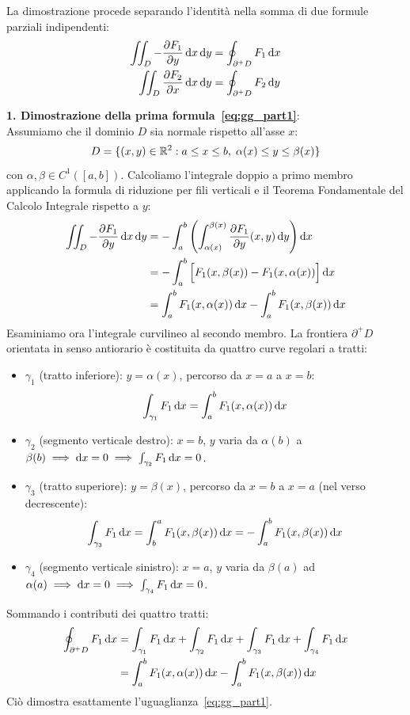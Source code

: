 \begin{dimostrazione}
La dimostrazione procede separando l'identità nella somma di due formule parziali indipendenti:
\begin{align}
\label{eq:gg_part1}
\iint_D -\frac{\partial F_1}{\partial y} \mathop{}\!\mathrm{d} x\mathop{}\!\mathrm{d} y &= \oint_{\partial^+ D} F_1 \mathop{}\!\mathrm{d} x \\
\label{eq:gg_part2}
\iint_D \frac{\partial F_2}{\partial x} \mathop{}\!\mathrm{d} x\mathop{}\!\mathrm{d} y &= \oint_{\partial^+ D} F_2 \mathop{}\!\mathrm{d} y
\end{align}

\medskip\noindent\textbf{1. Dimostrazione della prima formula~\eqref{eq:gg_part1}}:\\
Assumiamo che il dominio $D$ sia normale rispetto all'asse $x$:
\[
D = \{(x,y) \in \mathbb{R}^2 : a \le x \le b, \; \alpha(x) \le y \le \beta(x)\}
\]
con $\alpha, \beta \in C^1([a,b])$.
Calcoliamo l'integrale doppio a primo membro applicando la formula di riduzione per fili verticali e il Teorema Fondamentale del Calcolo Integrale rispetto a $y$:
\begin{align*}
\iint_D -\frac{\partial F_1}{\partial y} \mathop{}\!\mathrm{d} x\mathop{}\!\mathrm{d} y &= -\int_{a}^{b} \left( \int_{\alpha(x)}^{\beta(x)} \frac{\partial F_1}{\partial y}(x,y) \mathop{}\!\mathrm{d} y \right) \mathop{}\!\mathrm{d} x \\
&= -\int_{a}^{b} \Big[ F_1(x, \beta(x)) - F_1(x, \alpha(x)) \Big] \mathop{}\!\mathrm{d} x \\
&= \int_{a}^{b} F_1(x, \alpha(x)) \mathop{}\!\mathrm{d} x - \int_{a}^{b} F_1(x, \beta(x)) \mathop{}\!\mathrm{d} x
\end{align*}
Esaminiamo ora l'integrale curvilineo al secondo membro. La frontiera $\partial^+ D$ orientata in senso antiorario è costituita da quattro curve regolari a tratti:
\begin{itemize}
    \item $\gamma_1$ (tratto inferiore): $y = \alpha(x)$, percorso da $x = a$ a $x = b$:
    \[
    \int_{\gamma_1} F_1 \mathop{}\!\mathrm{d} x = \int_{a}^{b} F_1(x, \alpha(x)) \mathop{}\!\mathrm{d} x
    \]
    \item $\gamma_2$ (segmento verticale destro): $x = b$, $y$ varia da $\alpha(b)$ a $\beta(b) \implies \mathop{}\!\mathrm{d} x = 0 \implies \int_{\gamma_2} F_1 \mathop{}\!\mathrm{d} x = 0$.
    \item $\gamma_3$ (tratto superiore): $y = \beta(x)$, percorso da $x = b$ a $x = a$ (nel verso decrescente):
    \[
    \int_{\gamma_3} F_1 \mathop{}\!\mathrm{d} x = \int_{b}^{a} F_1(x, \beta(x)) \mathop{}\!\mathrm{d} x = -\int_{a}^{b} F_1(x, \beta(x)) \mathop{}\!\mathrm{d} x
    \]
    \item $\gamma_4$ (segmento verticale sinistro): $x = a$, $y$ varia da $\beta(a)$ ad $\alpha(a) \implies \mathop{}\!\mathrm{d} x = 0 \implies \int_{\gamma_4} F_1 \mathop{}\!\mathrm{d} x = 0$.
\end{itemize}
Sommando i contributi dei quattro tratti:
\begin{align*}
\oint_{\partial^+ D} F_1 \mathop{}\!\mathrm{d} x &= \int_{\gamma_1} F_1\mathop{}\!\mathrm{d} x + \int_{\gamma_2} F_1\mathop{}\!\mathrm{d} x + \int_{\gamma_3} F_1\mathop{}\!\mathrm{d} x + \int_{\gamma_4} F_1\mathop{}\!\mathrm{d} x \\
&= \int_{a}^{b} F_1(x, \alpha(x)) \mathop{}\!\mathrm{d} x - \int_{a}^{b} F_1(x, \beta(x)) \mathop{}\!\mathrm{d} x
\end{align*}
Ciò dimostra esattamente l'uguaglianza~\eqref{eq:gg_part1}.


\end{dimostrazione}
